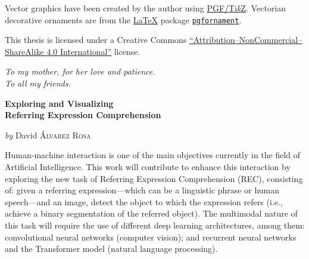 Vector graphics have been created by the author using
\href{https://www.ctan.org/pkg/pgf}{PGF/Ti\emph{k}Z}. Vectorian decorative
ornaments are from the \href{https://www.latex-project.org//}{\LaTeX} package
\href{https://ctan.org/pkg/pgfornament}{\texttt{pgfornament}}.

\bigskip\noindent
\begin{minipage}{.66\textwidth}
  This thesis is licensed under a Creative Commons
  \href{https://creativecommons.org/licenses/by-nc-sa/4.0/deed.en}{``At\-tri\-bu\-tion--NonCommercial--ShareAlike
    4.0 International''} license.
\end{minipage}\hfill
\begin{minipage}{.265\textwidth}
  \doclicenseImage[imagewidth=\textwidth]
\end{minipage}
\normalsize



\cleardoublepage{}
\thispagestyle{empty}
\begin{flushright}
  \itshape{}
  To my mother, for her love and patience. \\
  To all my friends.
\end{flushright}



\cleardoublepage{}
\thispagestyle{plain}
\null\vfill

\begin{center}
  \Large
  \textbf{Exploring and Visualizing\\
    Referring Expression Comprehension}

  \vspace{2ex}
  \large
  \textit{by} David \textsc{Álvarez Rosa}

  \vspace{3ex}
  \textbf{\abstractname}
\end{center}

\vspace{-2ex}
\noindent Human-machine interaction is one of the main objectives currently in
the field of Artificial Intelligence. This work will contribute to enhance this
interaction by exploring the new task of Referring Expression Comprehension
(REC), consisting of: given a referring expression---which can be a linguistic
phrase or human speech---and an image, detect the object to which the
expression refers (i.e., achieve a binary segmentation of the referred
object). The multimodal nature of this task will require the use of different
deep learning architectures, among them: convolutional neural networks
(computer vision); and recurrent neural networks and the Transformer model
(natural language processing).

